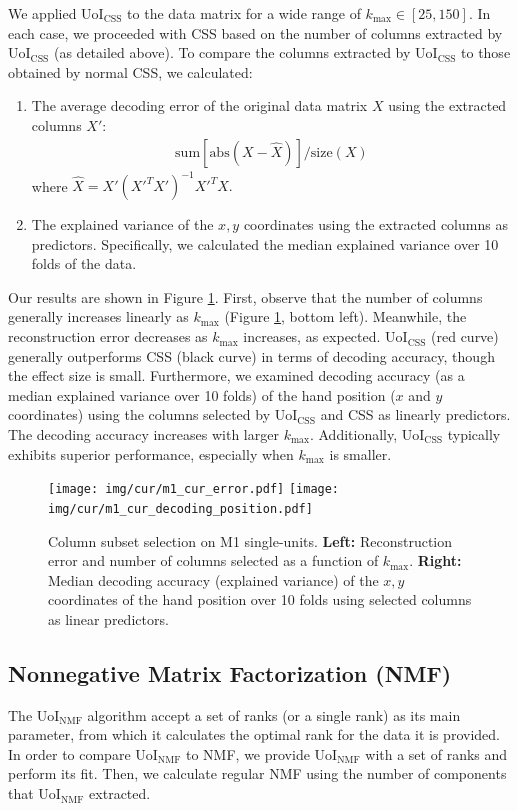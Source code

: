 \documentclass[11pt]{article}
\begin{document}
We applied UoI$_{\text{CSS}}$ to the data matrix for a wide range of $k_{\text{max}} \in [25, 150]$. In each case, we proceeded with CSS based on the number of columns extracted by UoI$_{\text{CSS}}$ (as detailed above). To compare the columns extracted by UoI$_{\text{CSS}}$ to those obtained by normal CSS, we calculated:
\begin{enumerate}[label=\textbf{(\arabic*)}]
\item The average decoding error of the original data matrix $X$ using the extracted columns $X'$:
\begin{align}
	\text{sum}\left[\text{abs}(X - \hat{X})\right]/\text{size}(X)
\end{align}
where $\hat{X} = X'(X'^T X')^{-1}X'^T X.$
\item The explained variance of the $x,y$ coordinates using the extracted columns as predictors. Specifically, we calculated the median explained variance over 10 folds of the data.
\end{enumerate}


Our results are shown in Figure \ref{fig:cur_m1}. First, observe that the number of columns generally increases linearly as $k_{\text{max}}$ (Figure \ref{fig:cur_m1}, bottom left). Meanwhile, the reconstruction error decreases as $k_{\text{max}}$ increases, as expected. UoI$_{\text{CSS}}$ (red curve) generally outperforms CSS (black curve) in terms of decoding accuracy, though the effect size is small. Furthermore, we examined decoding accuracy (as a median explained variance over 10 folds) of the hand position ($x$ and $y$ coordinates) using the columns selected by UoI$_{\text{CSS}}$ and CSS as linearly predictors. The decoding accuracy increases with larger $k_{\text{max}}$. Additionally, UoI$_{\text{CSS}}$ typically exhibits superior performance, especially when $k_{\text{max}}$ is smaller.

\begin{figure}[H]
	\centering
	\texttt{[image: img/cur/m1\_cur\_error.pdf]}
	\texttt{[image: img/cur/m1\_cur\_decoding\_position.pdf]}
	\caption{Column subset selection on M1 single-units. \textbf{Left: } Reconstruction error and number of columns selected as a function of $k_{\text{max}}$. \textbf{Right:} Median decoding accuracy (explained variance) of the $x,y$ coordinates of the hand position over 10 folds using selected columns as linear predictors.}
	\label{fig:cur_m1}
\end{figure}
\subsection{Nonnegative Matrix Factorization (NMF)}
The UoI$_{\text{NMF}}$ algorithm accept a set of ranks (or a single rank) as its main parameter, from which it calculates the optimal rank for the data it is provided. In order to compare UoI$_{\text{NMF}}$ to NMF, we provide UoI$_{\text{NMF}}$ with a set of ranks and perform its fit. Then, we calculate regular NMF using the number of components that UoI$_{\text{NMF}}$ extracted. 
\end{document}
